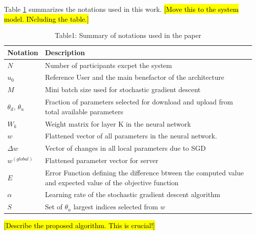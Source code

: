 \documentclass[conference]{IEEEtran}
\begin{document}
Table \ref{table:1} summarizes the notations used in this work. \hl{[Move this to the system model. INcluding the table.]}
\begin{table}[!h]
\centering
\caption{Table1: Summary of notations used in the paper}
\label{table:1}
\begin{tabular}{ | m{} | m{}| } 
\hline
\textbf{Notation} & \textbf{Description} \\
 \hline\hline

$N$ & Number of participants excpet the system\\
\hline
$u_0$ & Reference User and the  main benefactor of the architecture \\
\hline
$M$ & Mini batch size used for stochastic gradient descent\\
\hline
$\theta_d$, $\theta_u$ & Fraction of parameters selected for download and upload from total available parameters \\
\hline
$W_k$ & Weight matrix for layer K in the neural network\\
\hline
$w$ & Flattened vector of all parameters in the neural network. \\
\hline
$\Delta w$ & Vector of changes in all local parameters due to SGD\\
\hline
$w^{(global)}$ & Flattened parameter vector for server\\
\hline
$E$ & Error Function defining the difference btween the computed value and expected value of the objective function \\
\hline
$\alpha$ & Learning rate of the stochastic gradient descent algorithm\\
\hline
$S$ & Set of $\theta_u$ largest indices selected from $w$ \\
\hline
\end{tabular}
\end{table}


 
\hl{[Describe the proposed algorithm. This is crucial!]}
\end{document}
